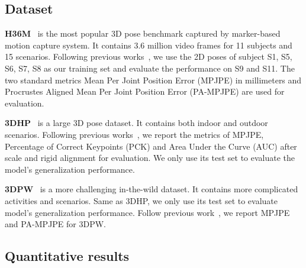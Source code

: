\documentclass[10pt,twocolumn,letterpaper]{article}
\begin{document}
\subsection{Dataset}
\noindent \textbf{H36M}~\cite{ionescu2014human3} 
is the most popular 3D pose benchmark captured by marker-based motion capture system.
It contains 3.6 million video frames for 11 subjects and 15 scenarios.
Following previous works~\cite{chen2019unsupervised, yu2021towards}, we use the 2D poses of subject S1, S5, S6, S7, S8 as our training set and evaluate the performance on S9 and S11.
The two standard metrics Mean Per Joint Position Error (MPJPE) in millimeters and Procrustes Aligned Mean Per Joint Position Error (PA-MPJPE) are used for evaluation.


\noindent \textbf{3DHP}~\cite{mehta2017vnect} is a large 3D pose dataset. It contains both indoor and outdoor scenarios.
Following previous works~\cite{kolotouros2019spin, chen2019unsupervised}, we report the metrics of MPJPE, Percentage of Correct Keypoints (PCK) and Area Under the Curve (AUC) after scale and rigid alignment for evaluation.
We only use its test set to evaluate the model's generalization performance.


\noindent \textbf{3DPW}~\cite{vonMarcard2018} is a more challenging in-the-wild dataset.
It contains more complicated activities and scenarios.
Same as 3DHP, we only use its test set to evaluate model's generalization performance.
Follow previous work~\cite{kolotouros2019spin}, we report MPJPE and PA-MPJPE for 3DPW.

\subsection{Quantitative results}
\end{document}
